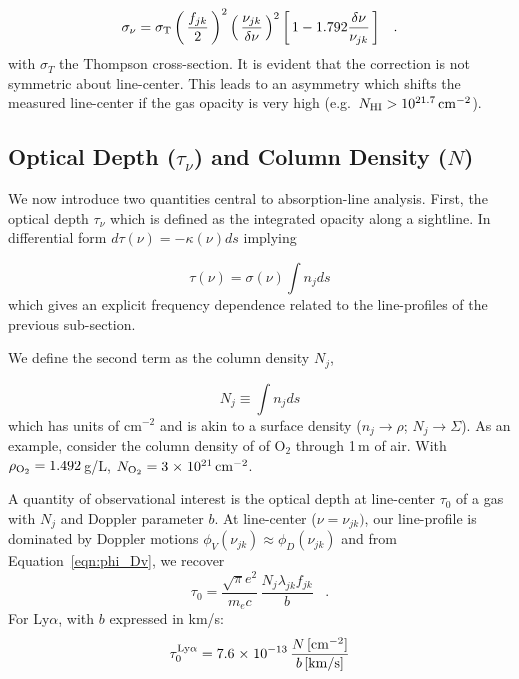 \documentclass[graybox]{svmult}
\def\ltk{\left [ \,}
\def\ltp{\left ( \,}
\def\rtk{\, \right  ] }
\def\rtp{\, \right  ) }
\def\sci#1{{\; \times \; 10^{#1}}}
\def\perd{\;\;\; .}
\newcommand{\mnhi}{N_{\rm HI}}
\def\cm#1{\, {\rm cm^{#1}}}
\begin{document}
\begin{equation}
\sigma_\nu = \sigma_{\rm T} \ltp \frac{f_{jk}}{2} \rtp^2 
\ltp \frac{\nu_{jk}}{\delta\nu} \rtp^2
\ltk 1 - 1.792 \frac{\delta\nu}{\nu_{jk}} \rtk  \perd
\end{equation}
with $\sigma_T$ the Thompson cross-section.
It is evident that the correction is not symmetric about line-center.
This leads to an asymmetry which
shifts the measured line-center if the gas opacity
is very high (e.g.\ $\mnhi > 10^{21.7} \cm{-2}$).

\subsection{Optical Depth ($\tau_\nu$) and Column Density ($N$)}
\label{subsec:tauN}

We now introduce two quantities central to absorption-line analysis.
First, the optical depth $\tau_\nu$ which is defined as the integrated
opacity along a sightline.  In differential form
$d\tau(\nu) = -\kappa(\nu) ds$ implying

\begin{equation}
\tau(\nu) = \sigma(\nu) \int n_j ds
\end{equation}
which gives an explicit frequency dependence related to the line-profiles
of the previous sub-section.

We define the second term as the column density $N_j$,

\begin{equation}
N_j \equiv \int n_j ds
\end{equation}
which has units of cm$^{-2}$ and is akin to a surface density
($n_j \to \rho$; $N_j \to \Sigma$).
As an example, consider the column density of 
of O$_2$ through 1\,m of air.  
With $\rho_{\rm O_2} = 1.492$\,g/L,
$N_{\rm O_2} = 3\sci{21} \cm{-2}$.

A quantity of observational interest is the 
optical depth at line-center $\tau_0$ of a gas with $N_j$
and Doppler parameter $b$.
At line-center ($\nu = \nu_{jk})$, our line-profile is 
dominated by Doppler motions
$\phi_V(\nu_{jk}) \approx \phi_D (\nu_{jk})$ and from 
Equation~\ref{eqn:phi_Dv}, we recover
\begin{equation}
\tau_0 =  \frac{\sqrt{\pi} e^2}{m_e c} \, \frac{N_j \lambda_{jk} f_{jk}}{b} \perd
\end{equation}
For Ly$\alpha$, with $b$ expressed in km/s:
\begin{equation}
\tau_0^{\rm Ly\alpha} =  7.6 \sci{-13} \, 
\frac{N \, [\rm cm^{-2}]}{b \, [\rm km/s]}
\label{eqn:tau0}
\end{equation}
\end{document}
